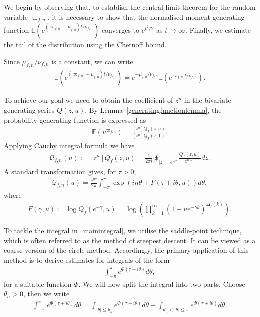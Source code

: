 \documentclass[12pt, oneside,reqno]{amsart}
\numberwithin{equation}{section}
\begin{document}
\medskip

We begin by observing that, to establish the central limit theorem for the random variable $\varpi_{f,n}$, it is necessary to show that the normalised moment generating function $\mathbb{E}\left(e^{(\varpi_{f,n}-\mu_{f,n})t/\nu_{f,n}}\right)$ converges to $e^{t^2/2}$ as $t \to \infty$. Finally, we estimate the tail of the distribution using the Chernoff bound.

\medskip

Since $\mu_{f,n}/\nu_{f,n}$ is a constant, we can write
\begin{align*}
\mathbb{E}\left(e^{(\varpi_{f,n}-\mu_{f,n})t/\nu_{f,n}}\right)  
=e^{-\mu_{f,n}/\nu_{f,n}}\mathbb{E}\left(e^{\varpi_{f,n}t/\nu_{f,n}}\right).
\end{align*}

\noindent
To achieve our goal we need to obtain the coefficient of $z^n$ in the bivariate generating series $Q(z,u)$. By Lemma~\ref{generatingfunctionlemma}, the probability generating function is expressed as
\begin{align*}
\mathbb{E}(u^{\varpi_{f,n}})
=\frac{[z^n]Q_f(z,u)}{[z^n]Q_f(z,1)}.
\end{align*}
\noindent
Applying Cauchy integral formula we have
\begin{align*}
\mathcal{Q}_{f,n}(u)
\coloneqq [z^n]Q_f(z,u)
=\frac{1}{2\pi i}\oint_{|z|=e^{-\tau}}\frac{Q_f(z,u)}{z^{n+1}}dz.
\end{align*}
\noindent
A standard transformation gives, for $\tau>0$,
\begin{align}\label{mainintegral}
\mathcal{Q}_{f,n}(u)
=\frac{e^{n\tau}}{2\pi}\int_{-\pi}^{\pi}\exp\left(in\theta+F(\tau+i\theta,u)\right)d\theta,
\end{align}
where
\begin{align}\label{logbivariategeneratingseries}
F(\gamma,u)
\coloneqq \log Q_f(e^{-\gamma},u)
=\log\left(\prod_{k=1}^{\infty}(1+ue^{-\gamma k})^{\Delta_f(k)}\right).
\end{align}

\noindent
To tackle the integral in~\eqref{mainintegral}, we utilise the saddle-point technique, which is often referred to as the method of steepest descent. It can be viewed as a coarse version of the circle method. Accordingly, the primary application of this method is to derive estimates for integrals of the form
\begin{align*}
\int_{-\pi}^{\pi} e^{\Phi(\tau+i\theta)}d\theta,   
\end{align*}
for a suitable function $\Phi$. We will now split the integral into two parts. Choose $\theta_n>0$, then we write
\begin{align}\label{integralsplit}
\int_{-\pi}^{\pi} e^{\Phi(\tau+i\theta)}d\theta
=\int_{|\theta|\leq \theta_n} e^{\Phi(\tau+i\theta)}d\theta
+\int_{\theta_n<|\theta|\leq \pi}e^{\Phi(\tau+i\theta)}d\theta.
\end{align}
\end{document}
